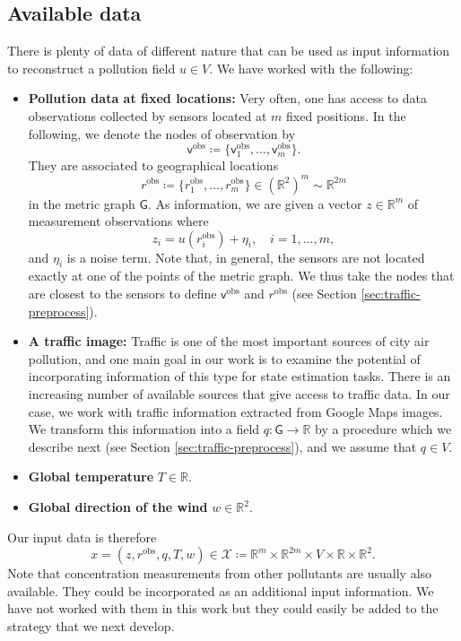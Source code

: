 \documentclass[11pt,a4paper,twoside]{article}
\theoremstyle{definition}
\numberwithin{equation}{section}
\newcommand{\cX}{\ensuremath{\mathcal{X}}}
\newcommand{\bR}{\ensuremath{\mathbb{R}}}
\newcommand{\G}{\ensuremath{\textsf{G}}} %
\newcommand{\vv}{\ensuremath{\textsf{v}}}
\newcommand{\<}{\langle}
\renewcommand{\>}{\rangle}
\newcommand{\obs}{\ensuremath{\text{obs}}}
\begin{document}
\subsection{Available data}
\label{sec:data}
There is plenty of data of different nature that can be used as input information to reconstruct a pollution field $u\in V$. We have worked with the following:
\begin{itemize}
\item \textbf{Pollution data at fixed locations:} Very often, one has access to data observations collected by sensors located at $m$ fixed positions. In the following, we denote the nodes of observation by
$$
\vv^\obs\coloneqq \{\vv^\obs_1,\dots,\vv_m^\obs\}.
$$
They are associated to geographical locations
$$
r^\obs \coloneqq\{r_1^\obs, \dots, r_m^\obs\} \in (\bR^2)^m \sim \bR^{2m}
$$ in the metric graph $\G$. As information, we are given a vector $z\in \bR^m$ of measurement observations where
$$
z_i = u(r_i^\obs) + \eta_i, \quad i=1,\dots, m,
$$
and $\eta_i$ is a noise term. Note that, in general, the sensors are not located exactly at one of the points of the metric graph. We thus take the nodes that are closest to the sensors to define $\vv^\obs$ and $r^\obs$ (see Section \ref{sec:traffic-preprocess}).
\item \textbf{A traffic image:} Traffic is one of the most important sources of city air pollution, and one main goal in our work is to examine the potential of incorporating information of this type for state estimation tasks. There is an increasing number of available sources that give access to traffic data. In our case, we work with traffic information extracted from Google Maps images. We transform this information into a field $q:\G\to \bR$ by a procedure which we describe next (see Section \ref{sec:traffic-preprocess}), and we assume that $q\in V$.
\item \textbf{Global temperature} $T\in \bR$.
\item \textbf{Global direction of the wind} $w\in \bR^2$.
\end{itemize}
Our input data is therefore
$$
x = (z, r^\obs, q, T, w) \in \cX \coloneqq \bR^m \times \bR^{2m} \times V \times \bR\times \bR^2.
$$
Note that concentration measurements from other pollutants are usually also available. They could be incorporated as an additional input information. We have not worked with them in this work but they could easily be added to the strategy that we next develop.
\end{document}
